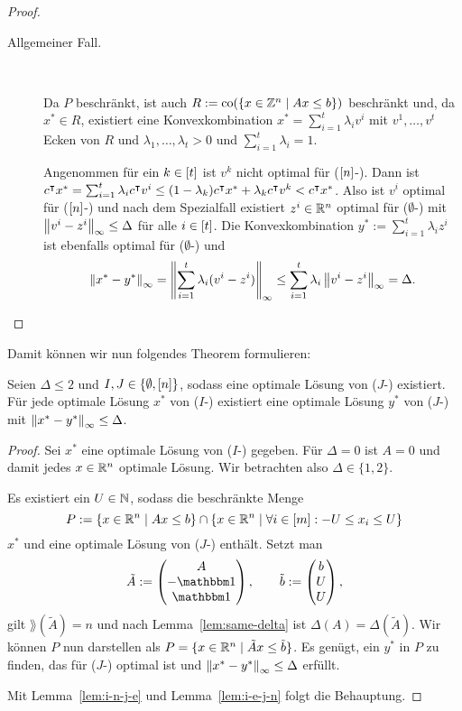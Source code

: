 \begin{proof}
\begin{description}
		\item[Allgemeiner Fall.] ~
		
		Da $P$ beschränkt, ist auch $R:=\operatorname{co}(\{x\in\mathbb{Z}^n \mid Ax\leq b\})$ beschränkt und, da $x^*\in R$, existiert eine Konvexkombination $x^* = \sum_{i=1}^t \lambda_i v^i$ mit $v^1,\dots,v^t$ Ecken von $R$ und $\lambda_1,\dots,\lambda_t>0$ und $\sum_{i=1}^t \lambda_i=1$.
		
		Angenommen für ein $k\in[t]$ ist $v^k$ nicht optimal für ($[n]$-\MIPI).
		Dann ist $c^\intercal x^*=\sum_{i=1}^t \lambda_i c^\intercal v^i \leq (1-\lambda_k)c^\intercal x^* + \lambda_k c^\intercal v^k < c^\intercal x^*$.
		Also ist $v^i$ optimal für ($[n]$-\MIPI) und nach dem Spezialfall existiert $z^i\in\mathbb{R}^n$ optimal für ($\emptyset$-\MIPI) mit $\left\lVert v^i-z^i\right\rVert_\infty\leq \Delta$ für alle $i\in[t]$.
		Die Konvexkombination $y^*:=\sum_{i=1}^t \lambda_i z^i$ ist ebenfalls optimal für ($\emptyset$-\MIPI) und
		$$\left\lVert x^*-y^*\right\rVert_\infty=\left\lVert\sum_{i=1}^t \lambda_i (v^i-z^i)\right\rVert_\infty\leq \sum_{i=1}^t \lambda_i \left\lVert v^i-z^i\right\rVert_\infty=\Delta.$$
	\end{description}
\end{proof}
Damit können wir nun folgendes Theorem formulieren:
\begin{theorem}
		Seien $\Delta\leq 2$ und $I,J\in\{\emptyset,[n]\}$, sodass eine optimale Lösung von ($J$-\MIPI) existiert.
		Für jede optimale Lösung $x^*$ von ($I$-\MIPI) existiert eine optimale Lösung $y^*$ von ($J$-\MIPI) mit $\left\lVert x^*-y^*\right\rVert_\infty\leq \Delta$.
\end{theorem}
\begin{proof}
	Sei $x^*$ eine optimale Lösung von ($I$-\MIPI) gegeben.
	Für $\Delta=0$ ist $A=0$ und damit jedes $x\in\mathbb{R}^n$ optimale Lösung.
	Wir betrachten also $\Delta\in\{1,2\}$.
	
	Es existiert ein $U\in\mathbb{N}$, sodass die beschränkte Menge  $$P:=\{x\in\mathbb{R}^n\mid Ax\leq b\} \cap \{x\in\mathbb{R}^n \mid \forall i\in[m]: -U \leq x_i \leq U \}$$
	$x^*$ und eine optimale Lösung von ($J$-\MIPI) enthält.
	Setzt man
	$$\tilde{A}:=\begin{pmatrix} A \\ -\one \\ \one \end{pmatrix},\qquad\tilde{b}:=\begin{pmatrix} b \\ U \\ U \end{pmatrix},$$
	gilt $\rang(\tilde{A})=n$ und nach Lemma~\ref{lem:same-delta} ist $\Delta(A)=\Delta(\tilde{A})$.
	Wir können $P$ nun darstellen als $P=\{ x\in\mathbb{R}^n \mid \tilde{A}x \leq \tilde{b} \}$.
	Es genügt, ein $y^*$ in $P$ zu finden, das für ($J$-\MIPI) optimal ist und $\left\lVert x^* - y^*\right\rVert_\infty\leq\Delta$ erfüllt.
	
	Mit Lemma~\ref{lem:i-n-j-e} und Lemma~\ref{lem:i-e-j-n} folgt die Behauptung.
\end{proof}